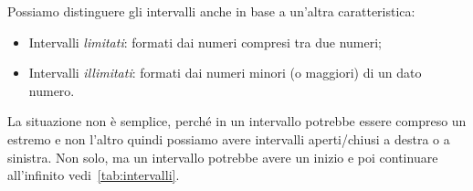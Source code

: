 Possiamo distinguere gli intervalli anche in base a un'altra 
caratteristica:

\begin{itemize} [noitemsep]
\item Intervalli \emph{limitati}: formati dai numeri compresi tra due 
numeri;
\item Intervalli \emph{illimitati}: formati dai numeri minori (o maggiori) 
di un dato numero.
\end{itemize}

% 

La situazione non è semplice, perché in un intervallo potrebbe essere 
compreso un estremo e non l'altro quindi possiamo avere intervalli 
aperti/chiusi a destra o a sinistra. 
Non solo, ma un intervallo potrebbe avere un inizio e poi continuare 
all'infinito vedi~\ref{tab:intervalli}.

